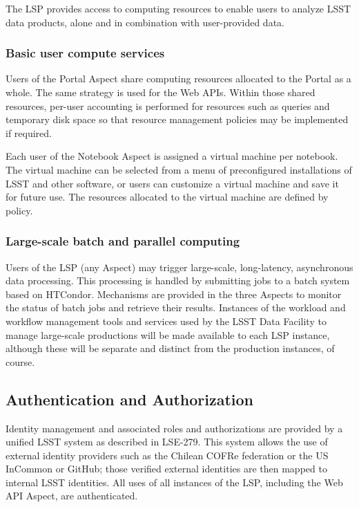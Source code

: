 The LSP provides access to computing resources to enable users to analyze
LSST data products, alone and in combination with user-provided data.

\subsubsection{Basic user compute services}\label{basic-user-compute-services}

Users of the Portal Aspect share computing resources allocated to the Portal as
a whole.  The same strategy is used for the Web APIs.  Within those shared
resources, per-user accounting is performed for resources such as queries and
temporary disk space so that resource management policies may be implemented
if required.

Each user of the Notebook Aspect is assigned a virtual machine per notebook.
The virtual machine can be selected from a menu of preconfigured installations
of LSST and other software, or users can customize a virtual machine and save
it for future use.  The resources allocated to the virtual machine are
defined by policy.

\subsubsection{Large-scale batch and parallel computing}\label{large-scale-batch-and-parallel-computing}

Users of the LSP (any Aspect) may trigger large-scale, long-latency,
asynchronous data processing.  This processing is handled by submitting jobs to
a batch system based on HTCondor.  Mechanisms are provided in the three Aspects
to monitor the status of batch jobs and retrieve their results.  Instances of
the workload and workflow management tools and services used by the LSST Data
Facility to manage large-scale productions will be made available to each LSP
instance, although these will be separate and distinct from the production
instances, of course.

\subsection{Authentication and Authorization}\label{authentication-and-authorization}

Identity management and associated roles and authorizations are provided by a
unified LSST system as described in LSE-279.  This system allows the use of
external identity providers such as the Chilean COFRe federation \citep{COFRe}
or the US InCommon \citep{InCommon} or GitHub; those verified external
identities are then mapped to internal LSST identities.  All uses of all
instances of the LSP, including the Web API Aspect, are authenticated.

